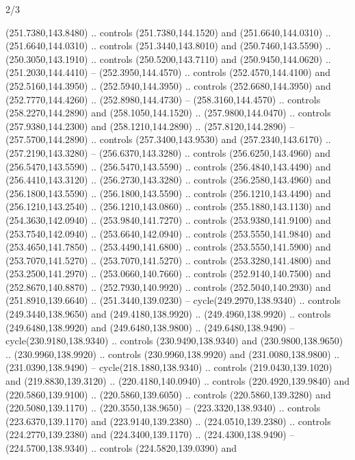 \begin{flagdescription}{2/3}
\begin{scope}[xshift=0.5\flaglength,yshift=0.5\flagwidth,scale=\flagwidth/259.2]
\begin{scope}[y=0.8pt, x=0.8pt, yscale=-1,shift={(-243,-162)}]
      (251.7380,143.8480) .. controls (251.7380,144.1520) and (251.6640,144.0310) ..
      (251.6640,144.0310) .. controls (251.3440,143.8010) and (250.7460,143.5590) ..
      (250.3050,143.1910) .. controls (250.5200,143.7110) and (250.9450,144.0620) ..
      (251.2030,144.4410) -- (252.3950,144.4570) .. controls (252.4570,144.4100) and
      (252.5160,144.3950) .. (252.5940,144.3950) .. controls (252.6680,144.3950) and
      (252.7770,144.4260) .. (252.8980,144.4730) -- (258.3160,144.4570) .. controls
      (258.2270,144.2890) and (258.1050,144.1520) .. (257.9800,144.0470) .. controls
      (257.9380,144.2300) and (258.1210,144.2890) .. (257.8120,144.2890) --
      (257.5700,144.2890) .. controls (257.3400,143.9530) and (257.2340,143.6170) ..
      (257.2190,143.3280) -- (256.6370,143.3280) .. controls (256.6250,143.4960) and
      (256.5470,143.5590) .. (256.5470,143.5590) .. controls (256.4840,143.4490) and
      (256.4410,143.3120) .. (256.2730,143.3280) .. controls (256.2580,143.4960) and
      (256.1800,143.5590) .. (256.1800,143.5590) .. controls (256.1210,143.4490) and
      (256.1210,143.2540) .. (256.1210,143.0860) .. controls (255.1880,143.1130) and
      (254.3630,142.0940) .. (253.9840,141.7270) .. controls (253.9380,141.9100) and
      (253.7540,142.0940) .. (253.6640,142.0940) .. controls (253.5550,141.9840) and
      (253.4650,141.7850) .. (253.4490,141.6800) .. controls (253.5550,141.5900) and
      (253.7070,141.5270) .. (253.7070,141.5270) .. controls (253.3280,141.4800) and
      (253.2500,141.2970) .. (253.0660,140.7660) .. controls (252.9140,140.7500) and
      (252.8670,140.8870) .. (252.7930,140.9920) .. controls (252.5040,140.2930) and
      (251.8910,139.6640) .. (251.3440,139.0230) -- cycle(249.2970,138.9340) ..
      controls (249.3440,138.9650) and (249.4180,138.9920) .. (249.4960,138.9920) ..
      controls (249.6480,138.9920) and (249.6480,138.9800) .. (249.6480,138.9490) --
      cycle(230.9180,138.9340) .. controls (230.9490,138.9340) and
      (230.9800,138.9650) .. (230.9960,138.9920) .. controls (230.9960,138.9920) and
      (231.0080,138.9800) .. (231.0390,138.9490) -- cycle(218.1880,138.9340) ..
      controls (219.0430,139.1020) and (219.8830,139.3120) .. (220.4180,140.0940) ..
      controls (220.4920,139.9840) and (220.5860,139.9100) .. (220.5860,139.6050) ..
      controls (220.5860,139.3280) and (220.5080,139.1170) .. (220.3550,138.9650) --
      (223.3320,138.9340) .. controls (223.6370,139.1170) and (223.9140,139.2380) ..
      (224.0510,139.2380) .. controls (224.2770,139.2380) and (224.3400,139.1170) ..
      (224.4300,138.9490) -- (224.5700,138.9340) .. controls (224.5820,139.0390) and

\end{scope}
\end{scope}
\end{flagdescription}
